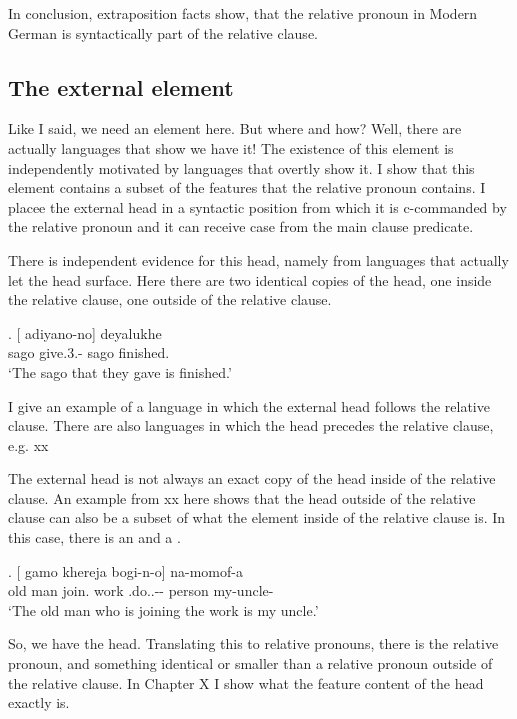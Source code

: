 In conclusion, extraposition facts show, that the relative pronoun in Modern German is syntactically part of the relative clause.


\subsection{The external element}

Like I said, we need an element here. But where and how? Well, there are actually languages that show we have it!
The existence of this element is independently motivated by languages that overtly show it.
I show that this element contains a subset of the features that the relative pronoun contains.
I placee the external head in a syntactic position from which it is c-commanded by the relative pronoun and it can receive case from the main clause predicate.


There is independent evidence for this head, namely from languages that actually let the head surface. Here there are two identical copies of the head, one inside the relative clause, one outside of the relative clause.

\exg. [ adiyano-no]  deyalukhe\\
 sago give.3.- sago finished.\\
 `The sago that they gave is finished.' 

I give an example of a language in which the external head follows the relative clause. There are also languages in which the head precedes the relative clause, e.g. xx

The external head is not always an exact copy of the head inside of the relative clause. An example from xx here shows that the head outside of the relative clause can also be a subset of what the element inside of the relative clause is. In this case, there is an  and a .

\exg. [ gamo khereja bogi-n-o]  na-momof-a\\
 {old man} join. work .do..-- person my-uncle-\\
 `The old man who is joining the work is my uncle.'

So, we have the head. Translating this to relative pronouns, there is the relative pronoun, and something identical or smaller than a relative pronoun outside of the relative clause. In Chapter X I show what the feature content of the head exactly is.

